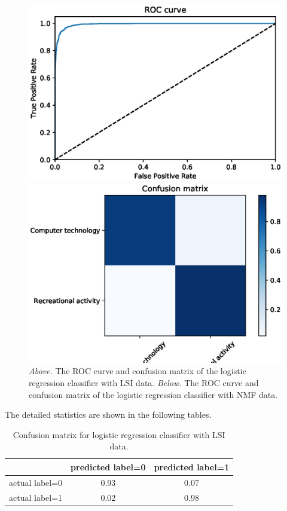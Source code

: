 \documentclass[letterpaper]{article}
\begin{document}
\begin{figure}[!htb]
\begin{minipage}{0.5\textwidth}
\includegraphics[width=1.0\textwidth]{roc-nmf-log-reg}
\end{minipage}%
\begin{minipage}{0.5\textwidth}
\includegraphics[width=1.0\textwidth]{conf-mat-nmf-log-reg}
\end{minipage}
\caption{\emph{Above.} The ROC curve and confusion matrix
of the logistic regression classifier with LSI data.
\emph{Below.} The ROC curve and confusion matrix of the logistic regression
classifier with NMF data.}
\label{fig:lr-2}
\end{figure}

The detailed statistics are shown in the following tables.
\begin{table}[H]
\centering
\begin{tabular}{c|cc}
 & predicted label=0 & predicted label=1 \\ \hline
actual label=0 & 0.93 & 0.07 \\
actual label=1 & 0.02 & 0.98 \\
\end{tabular}
\caption{Confusion matrix for logistic regression classifier with LSI data.}
\end{table}
\end{document}
